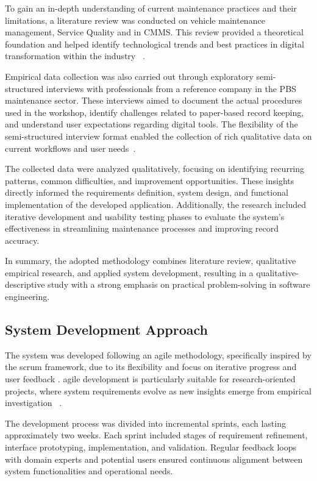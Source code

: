 To gain an in-depth understanding of current maintenance practices and their limitations, a literature review was conducted on vehicle maintenance management, Service Quality and in \ac{CMMS}. This review provided a theoretical foundation and helped identify technological trends and best practices in digital transformation within the industry ~\cite{Yin_2018, Saunders_2019}.

Empirical data collection was also carried out through exploratory semi-structured interviews with professionals from a reference company in the \acs{PBS} maintenance sector. These interviews aimed to document the actual procedures used in the workshop, identify challenges related to paper-based record keeping, and understand user expectations regarding digital tools. The flexibility of the semi-structured interview format enabled the collection of rich qualitative data on current workflows and user needs~\cite{Quivy_2008}.

The collected data were analyzed qualitatively, focusing on identifying recurring patterns, common difficulties, and improvement opportunities. These insights directly informed the requirements definition, system design, and functional implementation of the developed application. Additionally, the research included iterative development and usability testing phases to evaluate the system's effectiveness in streamlining maintenance processes and improving record accuracy.

In summary, the adopted methodology combines literature review, qualitative empirical research, and applied system development, resulting in a qualitative-descriptive study with a strong emphasis on practical problem-solving in software engineering.

\subsection{System Development Approach}
\label{subsec:agile}

The system was developed following an \acs{agile} methodology, specifically inspired by the \acs{scrum} framework, due to its flexibility and focus on iterative progress and user feedback \cite{Agile_2008}. \acs{agile} development is particularly suitable for research-oriented projects, where system requirements evolve as new insights emerge from empirical investigation ~\cite{Beck_2001, Pressman_2020}.

The development process was divided into incremental sprints, each lasting approximately two weeks. Each sprint included stages of requirement refinement, interface prototyping, implementation, and validation. Regular feedback loops with domain experts and potential users ensured continuous alignment between system functionalities and operational needs.

